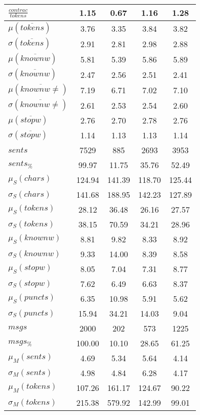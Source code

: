 \begin{table}[h!]
\begin{center}
\begin{tabular}{| l || c | c | c | c |}
$\frac{contrac}{tokens}$ & 1.15  & 0.67  & 1.16  & 1.28 \\\hline\hline
$\mu(\overline{tokens})$ & 3.76  & 3.35  & 3.84  & 3.82 \\
$\sigma(\overline{tokens})$ & 2.91  & 2.81  & 2.98  & 2.88 \\\hline
$\mu(\overline{knownw})$ & 5.81  & 5.39  & 5.86  & 5.89 \\
$\sigma(\overline{knownw})$ & 2.47  & 2.56  & 2.51  & 2.41 \\\hline
$\mu(\overline{knownw \neq})$ & 7.19  & 6.71  & 7.02  & 7.10 \\
$\sigma(\overline{knownw \neq})$ & 2.61  & 2.53  & 2.54  & 2.60 \\\hline
$\mu(\overline{stopw})$ & 2.76  & 2.70  & 2.78  & 2.76 \\
$\sigma(\overline{stopw})$ & 1.14  & 1.13  & 1.13  & 1.14 \\\hline\hline
$sents$ & 7529  & 885  & 2693  & 3953 \\
$sents_{\%}$ & 99.97  & 11.75  & 35.76  & 52.49 \\\hline
$\mu_S(chars)$ & 124.94  & 141.39  & 118.70  & 125.44 \\
$\sigma_S(chars)$ & 141.68  & 188.95  & 142.23  & 127.89 \\\hline
$\mu_S(tokens)$ & 28.12  & 36.48  & 26.16  & 27.57 \\
$\sigma_S(tokens)$ & 38.15  & 70.59  & 34.21  & 28.96 \\\hline
$\mu_S(knownw)$ & 8.81  & 9.82  & 8.33  & 8.92 \\
$\sigma_S(knownw)$ & 9.33  & 14.00  & 8.39  & 8.58 \\\hline
$\mu_S(stopw)$ & 8.05  & 7.04  & 7.31  & 8.77 \\
$\sigma_S(stopw)$ & 7.62  & 6.49  & 6.63  & 8.37 \\\hline
$\mu_S(puncts)$ & 6.35  & 10.98  & 5.91  & 5.62 \\
$\sigma_S(puncts)$ & 15.94  & 34.21  & 14.03  & 9.04 \\\hline\hline
$msgs$ & 2000  & 202  & 573  & 1225 \\
$msgs_{\%}$ & 100.00  & 10.10  & 28.65  & 61.25 \\\hline
$\mu_M(sents)$ & 4.69  & 5.34  & 5.64  & 4.14 \\
$\sigma_M(sents)$ & 4.98  & 4.84  & 6.28  & 4.17 \\\hline
$\mu_M(tokens)$ & 107.26  & 161.17  & 124.67  & 90.22 \\
$\sigma_M(tokens)$ & 215.38  & 579.92  & 142.99  & 99.01 \\\hline

\end{tabular}
\end{center}
\end{table}
